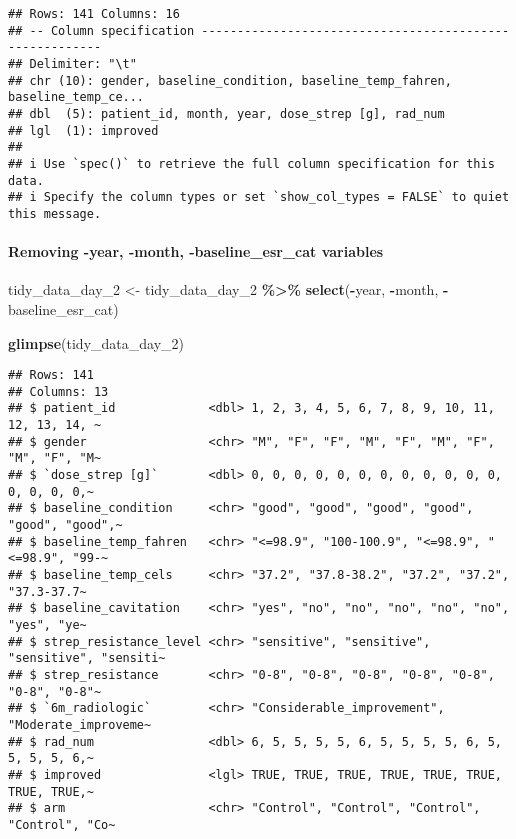 \documentclass[
]{article}
\newenvironment{Shaded}{\begin{snugshade}}{\end{snugshade}}
\newcommand{\FunctionTok}[1]{\textcolor[rgb]{0.13,0.29,0.53}{\textbf{#1}}}
\newcommand{\NormalTok}[1]{#1}
\newcommand{\OtherTok}[1]{\textcolor[rgb]{0.56,0.35,0.01}{#1}}
\newcommand{\SpecialCharTok}[1]{\textcolor[rgb]{0.81,0.36,0.00}{\textbf{#1}}}
\begin{document}
\begin{verbatim}
## Rows: 141 Columns: 16
## -- Column specification --------------------------------------------------------
## Delimiter: "\t"
## chr (10): gender, baseline_condition, baseline_temp_fahren, baseline_temp_ce...
## dbl  (5): patient_id, month, year, dose_strep [g], rad_num
## lgl  (1): improved
## 
## i Use `spec()` to retrieve the full column specification for this data.
## i Specify the column types or set `show_col_types = FALSE` to quiet this message.
\end{verbatim}

\paragraph{Removing -year, -month, -baseline\_esr\_cat
variables}\label{removing--year--month--baseline_esr_cat-variables}

\begin{Shaded}
\begin{Highlighting}[]
\NormalTok{tidy\_data\_day\_2 }\OtherTok{\textless{}{-}}\NormalTok{ tidy\_data\_day\_2 }\SpecialCharTok{\%\textgreater{}\%} \FunctionTok{select}\NormalTok{(}\SpecialCharTok{{-}}\NormalTok{year, }\SpecialCharTok{{-}}\NormalTok{month, }\SpecialCharTok{{-}}\NormalTok{baseline\_esr\_cat)}

\FunctionTok{glimpse}\NormalTok{(tidy\_data\_day\_2)}
\end{Highlighting}
\end{Shaded}

\begin{verbatim}
## Rows: 141
## Columns: 13
## $ patient_id             <dbl> 1, 2, 3, 4, 5, 6, 7, 8, 9, 10, 11, 12, 13, 14, ~
## $ gender                 <chr> "M", "F", "F", "M", "F", "M", "F", "M", "F", "M~
## $ `dose_strep [g]`       <dbl> 0, 0, 0, 0, 0, 0, 0, 0, 0, 0, 0, 0, 0, 0, 0, 0,~
## $ baseline_condition     <chr> "good", "good", "good", "good", "good", "good",~
## $ baseline_temp_fahren   <chr> "<=98.9", "100-100.9", "<=98.9", "<=98.9", "99-~
## $ baseline_temp_cels     <chr> "37.2", "37.8-38.2", "37.2", "37.2", "37.3-37.7~
## $ baseline_cavitation    <chr> "yes", "no", "no", "no", "no", "no", "yes", "ye~
## $ strep_resistance_level <chr> "sensitive", "sensitive", "sensitive", "sensiti~
## $ strep_resistance       <chr> "0-8", "0-8", "0-8", "0-8", "0-8", "0-8", "0-8"~
## $ `6m_radiologic`        <chr> "Considerable_improvement", "Moderate_improveme~
## $ rad_num                <dbl> 6, 5, 5, 5, 5, 6, 5, 5, 5, 5, 6, 5, 5, 5, 5, 6,~
## $ improved               <lgl> TRUE, TRUE, TRUE, TRUE, TRUE, TRUE, TRUE, TRUE,~
## $ arm                    <chr> "Control", "Control", "Control", "Control", "Co~
\end{verbatim}
\end{document}
